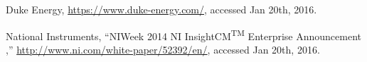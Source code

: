 \begin{thebibliography}{10}
Duke Energy, \url{https://www.duke-energy.com/}, accessed Jan 20th, 2016.

National Instruments, ``NIWeek 2014 NI InsightCM\textsuperscript{TM} Enterprise Announcement
,'' \url{http://www.ni.com/white-paper/52392/en/}, accessed Jan 20th, 2016.




\end{thebibliography}



